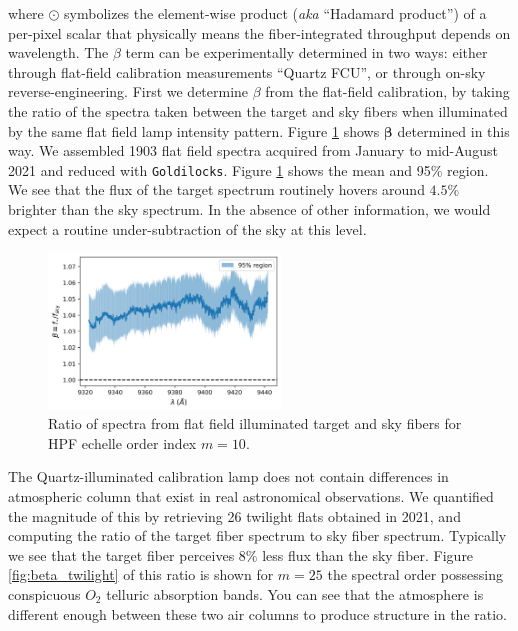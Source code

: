 \documentclass[modern]{aastex631}
\begin{document}
where $\odot$ symbolizes the element-wise product (\emph{aka} ``Hadamard product'') of a per-pixel scalar that physically means the fiber-integrated throughput depends on wavelength.  The $\beta$ term can be experimentally determined in two ways: either through flat-field calibration measurements ``Quartz FCU'', or through on-sky reverse-engineering.  First we determine $\beta$ from the flat-field calibration, by taking the ratio of the spectra taken between the target and sky fibers when illuminated by the same flat field lamp intensity pattern.  Figure \ref{fig:beta} shows $\boldsymbol{\beta}$ determined in this way.  We assembled 1903 flat field spectra acquired from January to mid-August 2021 and reduced with \texttt{Goldilocks}.  Figure \ref{fig:beta} shows the mean and 95\% region.  We see that the flux of the target spectrum routinely hovers around $4.5\%$ brighter than the sky spectrum.  In the absence of other information, we would expect a routine under-subtraction of the sky at this level.


\begin{figure}[ht]
  \centering
  \includegraphics[width=0.55\textwidth]{figures/HPF_flat_field_demo.png}
\caption{Ratio of spectra from flat field illuminated target and sky fibers for HPF echelle order index $m=10$.  }
\label{fig:beta}
\end{figure}

The Quartz-illuminated calibration lamp does not contain differences in atmospheric column that exist in real astronomical observations.  We quantified the magnitude of this by retrieving 26 twilight flats obtained in 2021, and computing the ratio of the target fiber spectrum to sky fiber spectrum.  Typically we see that the target fiber perceives $8\%$ less flux than the sky fiber.  Figure \ref{fig:beta_twilight} of this ratio is shown for $m=25$ the spectral order possessing conspicuous $O_2$ telluric absorption bands.  You can see that the atmosphere is different enough between these two air columns to produce structure in the ratio.
\end{document}

